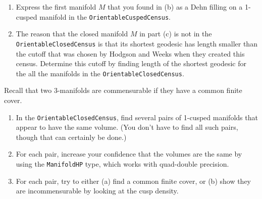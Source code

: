 \documentclass[tikz, a4paper]{nmd/hw}
\begin{document}
\begin{problems}
\begin{enumerate}
      \item Express the first manifold $M$ that you found in (b) as a
        Dehn filling on a 1-cusped manifold in the
        \texttt{OrientableCuspedCensus}.  

      \item The reason that the closed manifold $M$ in part (c) is not
        in the \texttt{OrientableClosedCensus} is that its shortest
        geodesic has length smaller than the cutoff that was chosen by
        Hodgson and Weeks when they created this census.  Determine
        this cutoff by finding length of the shortest geodesic for the
        all the manifolds in the \texttt{OrientableClosedCensus}.
    \end{enumerate}

\item Recall that two 3-manifolds are commensurable if they have a
  common finite cover.  
  \begin{enumerate}
  \item In the \texttt{OrientableClosedCensus}, find several pairs of
    1-cusped manifolds that appear to have the same volume. (You don't
    have to find all such pairs, though that can certainly be done.)

  \item For each pair, increase your confidence that the volumes are
    the same by using the \texttt{ManifoldHP} type, which works with
    quad-double precision.

    \item For each pair, try to either (a) find a common finite cover,
      or (b) show they are incommensurable by looking at the cusp
      density.  
  \end{enumerate}
\end{problems}
\end{document}
